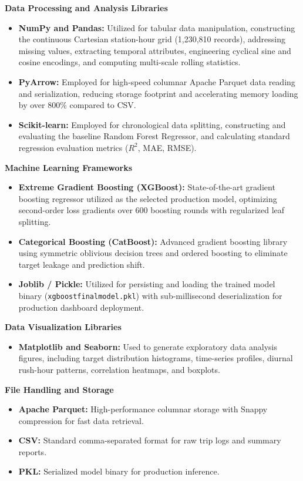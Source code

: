 \documentclass[12pt, a4paper]{article}
\renewcommand{\_}{\textunderscore\allowbreak}
\begin{document}
\noindent \textbf{Data Processing and Analysis Libraries}
\begin{itemize}
    \item \textbf{NumPy and Pandas:} Utilized for tabular data manipulation, constructing the continuous Cartesian station-hour grid (1,230,810 records), addressing missing values, extracting temporal attributes, engineering cyclical sine and cosine encodings, and computing multi-scale rolling statistics.
    \item \textbf{PyArrow:} Employed for high-speed columnar Apache Parquet data reading and serialization, reducing storage footprint and accelerating memory loading by over 800\% compared to CSV.
    \item \textbf{Scikit-learn:} Employed for chronological data splitting, constructing and evaluating the baseline Random Forest Regressor, and calculating standard regression evaluation metrics ($R^2$, MAE, RMSE).
\end{itemize}

\noindent \textbf{Machine Learning Frameworks}
\begin{itemize}
    \item \textbf{Extreme Gradient Boosting (XGBoost):} State-of-the-art gradient boosting regressor utilized as the selected production model, optimizing second-order loss gradients over 600 boosting rounds with regularized leaf splitting.
    \item \textbf{Categorical Boosting (CatBoost):} Advanced gradient boosting library using symmetric oblivious decision trees and ordered boosting to eliminate target leakage and prediction shift.
    \item \textbf{Joblib / Pickle:} Utilized for persisting and loading the trained model binary (\texttt{xgboost\_final\_model.pkl}) with sub-millisecond deserialization for production dashboard deployment.
\end{itemize}

\noindent \textbf{Data Visualization Libraries}
\begin{itemize}
    \item \textbf{Matplotlib and Seaborn:} Used to generate exploratory data analysis figures, including target distribution histograms, time-series profiles, diurnal rush-hour patterns, correlation heatmaps, and boxplots.
\end{itemize}

\noindent \textbf{File Handling and Storage}
\begin{itemize}
    \item \textbf{Apache Parquet:} High-performance columnar storage with Snappy compression for fast data retrieval.
    \item \textbf{CSV:} Standard comma-separated format for raw trip logs and summary reports.
    \item \textbf{PKL:} Serialized model binary for production inference.
\end{itemize}
\end{document}
